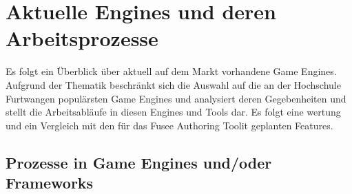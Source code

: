 \documentclass[pagesize, paper=a4, fontsize=12pt, titlepage=true, headings=small, headnosepline, abstractoff, liststotoc, nochapterprefix, plainheadsepline, twoside]{scrreprt}
\begin{document}

\section{Aktuelle Engines und deren Arbeitsprozesse}
Es folgt ein Überblick über aktuell auf dem Markt vorhandene Game Engines. Aufgrund der Thematik beschränkt sich die Auswahl auf die an der Hochschule Furtwangen populärsten Game Engines und analysiert deren Gegebenheiten und stellt die Arbeitsabläufe in diesen Engines und Tools dar. Es folgt eine wertung und ein Vergleich mit den für das Fusee Authoring Toolit geplanten Features.

\subsection{Prozesse in Game Engines und/oder Frameworks}
\end{document}
